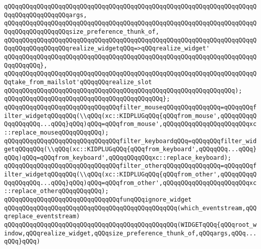 \verb|qQQqqQQqqQQqqQQqqQQqqQQqqQQqqQQqqQQqqQQqqQQqqQQqqQQqqQQqqQQqqQQqqQQqqQQqqQQqqQQqqQQqqQQqargs,|\newline
\verb|qQQqqQQqqQQqqQQqqQQqqQQqqQQqqQQqqQQqqQQqqQQqqQQqqQQqqQQqqQQqqQQqqQQqqQQqqQQqqQQqqQQqqQQqsize_preference_thunk_of,|\newline
\verb|qQQqqQQqqQQqqQQqqQQqqQQqqQQqqQQqqQQqqQQqqQQqqQQqqQQqqQQqqQQqqQQqqQQqqQQqqQQqqQQqqQQqqQQqrealize_widgetqQQq=>qQQqrealize_widget'|\newline
\verb|qQQqqQQqqQQqqQQqqQQqqQQqqQQqqQQqqQQqqQQqqQQqqQQqqQQqqQQqqQQqqQQqqQQqqQQqqQQqqQQq},|\newline
\newline
\verb|qQQqqQQqqQQqqQQqqQQqqQQqqQQqqQQqqQQqqQQqqQQqqQQqqQQqqQQqqQQqqQQqqQQqqQQqtake_from_mailslot'qQQqqQQqrealize_slot|\newline
\verb|qQQqqQQqqQQqqQQqqQQqqQQqqQQqqQQqqQQqqQQqqQQqqQQqqQQqqQQqqQQqqQQq);|\newline
\verb|qQQqqQQqqQQqqQQqqQQqqQQqqQQqqQQqqQQqqQQqqQQq};|\newline
\newline
\verb|qQQqqQQqqQQqqQQqqQQqqQQqqQQqqQQqfilter_mouseqQQqqQQqqQQqqQQq=qQQqqQQqfilter_widgetqQQqqQQq(\\qQQq(xc::KIDPLUGqQQq{qQQqfrom_mouse',qQQqqQQqqQQqqQQqqQQq...qQQq}qQQq)qQQq=qQQqfrom_mouse',qQQqqQQqqQQqqQQqqQQqqQQqxc::replace_mouseqQQqqQQqqQQq);|\newline
\verb|qQQqqQQqqQQqqQQqqQQqqQQqqQQqqQQqfilter_keyboardqQQq=qQQqqQQqfilter_widgetqQQqqQQq(\\qQQq(xc::KIDPLUGqQQq{qQQqfrom_keyboard',qQQqqQQq...qQQq}qQQq)qQQq=qQQqfrom_keyboard',qQQqqQQqqQQqxc::replace_keyboard);|\newline
\verb|qQQqqQQqqQQqqQQqqQQqqQQqqQQqqQQqfilter_otherqQQqqQQqqQQqqQQq=qQQqqQQqfilter_widgetqQQqqQQq(\\qQQq(xc::KIDPLUGqQQq{qQQqfrom_other',qQQqqQQqqQQqqQQqqQQq...qQQq}qQQq)qQQq=qQQqfrom_other',qQQqqQQqqQQqqQQqqQQqqQQqxc::replace_otherqQQqqQQqqQQq);|\newline
\newline
\newline
\verb|qQQqqQQqqQQqqQQqqQQqqQQqqQQqqQQqfunqQQqignore_widget|\newline
\verb|qQQqqQQqqQQqqQQqqQQqqQQqqQQqqQQqqQQqqQQqqQQqqQQq(which_eventstream,qQQqreplace_eventstream)|\newline
\verb|qQQqqQQqqQQqqQQqqQQqqQQqqQQqqQQqqQQqqQQqqQQqqQQq(WIDGETqQQq{qQQqroot_window,qQQqrealize_widget,qQQqsize_preference_thunk_of,qQQqargs,qQQq...qQQq}qQQq)|\newline
